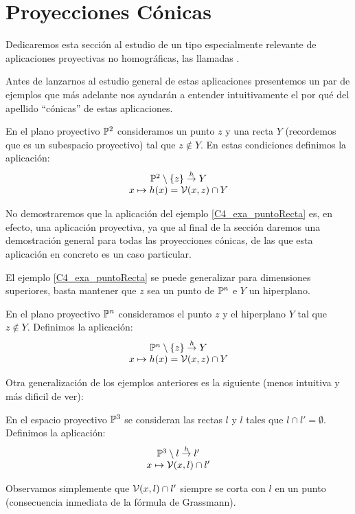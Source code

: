 \section{Proyecciones Cónicas}
Dedicaremos esta sección al estudio de un tipo especialmente relevante de aplicaciones proyectivas no homográficas, las llamadas .

Antes de lanzarnos al estudio general de estas aplicaciones presentemos un par de ejemplos que más adelante nos ayudarán a entender intuitivamente el por qué del apellido ``cónicas'' de estas aplicaciones.

\begin{exa}
	\label{C4_exa_puntoRecta}
	En el plano proyectivo $\mathbb{P}^2$ consideramos un punto $z$ y una recta $Y$ (recordemos que es un subespacio proyectivo) tal que $z\not\in Y$. En estas condiciones definimos la aplicación:
	\[\begin{array}{c}
		\mathbb{P}^2\setminus\{z\}\stackrel{h}{\to} Y\\
		x\mapsto h(x)=\mathcal{V}(x,z)\cap Y
	\end{array}\]
\end{exa}

No demostraremos que la aplicación del ejemplo \ref{C4_exa_puntoRecta} es, en efecto, una aplicación proyectiva, ya que al final de la sección daremos una demostración general para todas las proyecciones cónicas, de las que esta aplicación en concreto es un caso particular.

El ejemplo \ref{C4_exa_puntoRecta} se puede generalizar para dimensiones superiores, basta mantener que $z$ sea un punto de $\mathbb{P}^n$ e $Y$ un hiperplano.
\begin{exa}
	\label{C4_exa_puntoHiperplano}
	En el plano proyectivo $\mathbb{P}^n$ consideramos el punto $z$ y el hiperplano $Y$ tal que $z\not\in Y$. Definimos la aplicación:
	\[\begin{array}{c}
	\mathbb{P}^n\setminus\{z\}\stackrel{h}{\to} Y\\
	x\mapsto h(x)=\mathcal{V}(x,z)\cap Y
	\end{array}\]
\end{exa}
Otra generalización de los ejemplos anteriores es la siguiente (menos intuitiva y más dificil de ver):
\begin{exa}
	En el espacio proyectivo $\mathbb{P}^3$ se consideran las rectas $l$ y $l$ tales que $l\cap l'=\emptyset$. Definimos la aplicación:
	\[\begin{array}{c}
	\mathbb{P}^3\setminus l\stackrel{h}{\to}l'\\
	x\mapsto\mathcal{V}(x,l)\cap l'
	\end{array}\]
\end{exa}
Observamos simplemente que $\mathcal{V}(x,l)\cap l'$ siempre se corta con $l$ en un punto (consecuencia inmediata de la fórmula de Grassmann).

